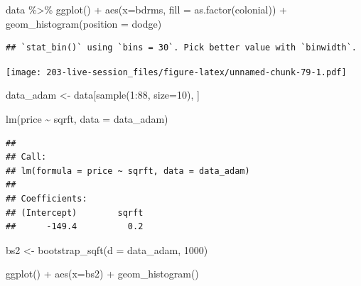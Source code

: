\documentclass[
]{book}
\newenvironment{Shaded}{\begin{snugshade}}{\end{snugshade}}
\newcommand{\AttributeTok}[1]{\textcolor[rgb]{0.77,0.63,0.00}{#1}}
\newcommand{\DecValTok}[1]{\textcolor[rgb]{0.00,0.00,0.81}{#1}}
\newcommand{\FunctionTok}[1]{\textcolor[rgb]{0.00,0.00,0.00}{#1}}
\newcommand{\NormalTok}[1]{#1}
\newcommand{\OtherTok}[1]{\textcolor[rgb]{0.56,0.35,0.01}{#1}}
\newcommand{\SpecialCharTok}[1]{\textcolor[rgb]{0.00,0.00,0.00}{#1}}
\newcommand{\StringTok}[1]{\textcolor[rgb]{0.31,0.60,0.02}{#1}}
\theoremstyle{definition}
\theoremstyle{definition}
\theoremstyle{definition}
\theoremstyle{definition}
\theoremstyle{remark}
\begin{document}
\begin{Shaded}
\begin{Highlighting}[]
\NormalTok{data }\SpecialCharTok{\%\textgreater{}\%} 
  \FunctionTok{ggplot}\NormalTok{() }\SpecialCharTok{+} 
  \FunctionTok{aes}\NormalTok{(}\AttributeTok{x=}\NormalTok{bdrms, }\AttributeTok{fill =} \FunctionTok{as.factor}\NormalTok{(colonial)) }\SpecialCharTok{+} 
  \FunctionTok{geom\_histogram}\NormalTok{(}\AttributeTok{position =} \StringTok{\textquotesingle{}dodge\textquotesingle{}}\NormalTok{)}
\end{Highlighting}
\end{Shaded}

\begin{verbatim}
## `stat_bin()` using `bins = 30`. Pick better value with `binwidth`.
\end{verbatim}

\texttt{[image: 203-live-session\_files/figure-latex/unnamed-chunk-79-1.pdf]}

\begin{Shaded}
\begin{Highlighting}[]
\NormalTok{data\_adam }\OtherTok{\textless{}{-}}\NormalTok{ data[}\FunctionTok{sample}\NormalTok{(}\DecValTok{1}\SpecialCharTok{:}\DecValTok{88}\NormalTok{, }\AttributeTok{size=}\DecValTok{10}\NormalTok{), ]}

\FunctionTok{lm}\NormalTok{(price }\SpecialCharTok{\textasciitilde{}}\NormalTok{ sqrft, }\AttributeTok{data =}\NormalTok{ data\_adam)}
\end{Highlighting}
\end{Shaded}

\begin{verbatim}
## 
## Call:
## lm(formula = price ~ sqrft, data = data_adam)
## 
## Coefficients:
## (Intercept)        sqrft  
##      -149.4          0.2
\end{verbatim}

\begin{Shaded}
\begin{Highlighting}[]
\NormalTok{bs2 }\OtherTok{\textless{}{-}} \FunctionTok{bootstrap\_sqft}\NormalTok{(}\AttributeTok{d =}\NormalTok{ data\_adam, }\DecValTok{1000}\NormalTok{)}

\FunctionTok{ggplot}\NormalTok{() }\SpecialCharTok{+} 
  \FunctionTok{aes}\NormalTok{(}\AttributeTok{x=}\NormalTok{bs2) }\SpecialCharTok{+} 
  \FunctionTok{geom\_histogram}\NormalTok{()}
\end{Highlighting}
\end{Shaded}
\end{document}
